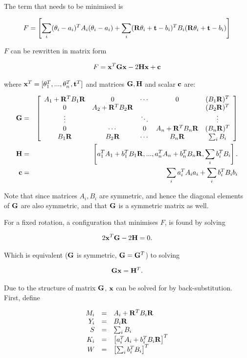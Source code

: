 The term that needs to be minimised is

$$
F = \left[ \sum_i (\theta_i - a_i)^T A_i (\theta_i - a_i) +
\sum_i ({\bf R}\theta_i + {\bf t} - b_i)^T B_i ({\bf R}\theta_i + {\bf t} - b_i)
\right]
$$

$F$ can be rewritten in matrix form

$$
F =  {\bf x}^T{\bf Gx} -2{\bf Hx} + {\bf c}
$$

where ${\bf x}^T = [\theta_1^T,...,\theta_n^T, {\bf t}^T]$ and
matrices ${\bf G},{\bf H}$ and scalar ${\bf c}$ are:

\begin{eqnarray}
{\bf G} &=& \left[ \begin{array}{ccccc}
A_1 + {\bf R}^TB_1{\bf R}&
0&\cdots&0&
(B_1{\bf R})^T\\
0&A_2 + {\bf R}^TB_2{\bf R}&&&(B_2{\bf R})^T\\
\vdots & & \ddots & & \vdots\\
0&\cdots&0&
A_n + {\bf R}^TB_n{\bf R}&
(B_n{\bf R})^T\\
B_1{\bf R}&B_2{\bf R}&\cdots&
B_n{\bf R}&
\sum_i B_i
\end{array} \right]\\
{\bf H}  &=& \left[a_1^TA_1+b_1^TB_1{\bf  R},...,
a_n^TA_n+b_n^TB_n{\bf R},
\sum_i b_i^TB_i
 \right].\\
{\bf c} &=& \sum_i a_i^TA_ia_i + \sum_i b_i^TB_ib_i
\end{eqnarray}

Note that since matrices $A_i,B_i$ are symmetric, and hence the
diagonal elements of ${\bf G}$ are also symmetric, and that ${\bf G}$
is a symmetric matrix as well. 


For a fixed rotation, a configuration that
minimises $F$, is found by solving

$$
2{\bf x}^T{\bf G} - 2{\bf H} = 0.
$$

Which is equivalent (${\bf G}$ is symmetric, ${\bf G} = {\bf G}^T$) to
solving

$$
 {\bf Gx} = {\bf H}^T.
$$

Due to the structure of matrix ${\bf G}$, ${\bf x}$ can be solved for
by back-substitution. First, define

\begin{equation}
\begin{array}{rcl}
M_i &=& A_i + {\bf R}^TB_i{\bf R}\\
Y_i &=& B_i{\bf R}\\
S   &=& \sum_i B_i \\
K_i &=& \left[a_i^TA_i + b_i^TB_i{\bf R}\right]^T\\
W   &=& \left[ \sum_i b_i^TB_i \right]^T
\end{array}
\end{equation}

